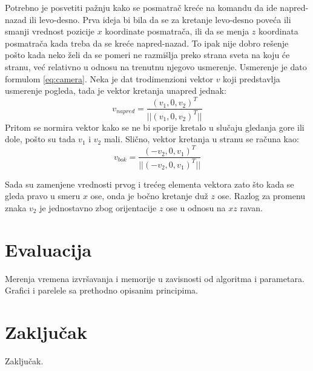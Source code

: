 \documentclass[12pt,oneside]{memoir}
\begin{document}
Potrebno je posvetiti pažnju kako se posmatrač kreće na komandu da ide napred-nazad ili levo-desno.
Prva ideja bi bila da se za kretanje levo-desno poveća ili smanji vrednost pozicije $x$ koordinate posmatrača,
ili da se menja $z$ koordinata posmatrača kada treba da se kreće napred-nazad.
To ipak nije dobro rešenje pošto kada neko želi da se pomeri ne razmišlja preko strana sveta na koju će stranu, 
već relativno u odnosu na trenutnu njegovo usmerenje. Usmerenje je dato formulom \ref{eq:camera}.
Neka je dat trodimenzioni vektor $v$ koji predstavlja usmerenje pogleda, tada je vektor 
kretanja unapred jednak: 
$$ v_{napred} = \frac{(v_1, 0, v_2)^T}{||(v_1, 0, v_2)^T||} $$
Pritom se normira vektor kako se ne bi sporije kretalo u slučaju gledanja gore ili dole, 
pošto su tada $v_1$ i $v_2$ mali.
Slično, vektor kretanja u stranu se računa kao:
$$ v_{bok} = \frac{(-v_2, 0, v_1)^T}{||(-v_2, 0, v_1)^T||} $$

Sada su zamenjene vrednosti prvog i trećeg elementa vektora zato što kada se gleda pravo u smeru $x$ ose, 
onda je bočno kretanje duž $z$ ose. Razlog za promenu znaka $v_2$ je jednostavno zbog orijentacije $z$ ose u odnosu na $xz$ ravan.

\chapter{Evaluacija}
\label{sec:evaluacija}

Merenja vremena izvršavanja i memorije u zavisnosti od algoritma i parametara.
Grafici i parelele sa prethodno opisanim principima.




\chapter{Zaključak}
\label{sec:zakljucak}

Zaključak. 

%  
% 


\literatura

\backmatter



\end{document}

